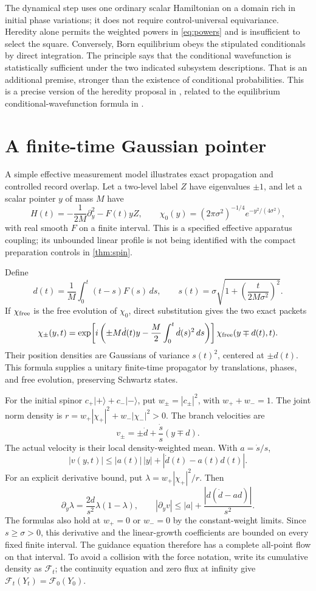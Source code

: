 \documentclass[11pt]{article}
\numberwithin{equation}{section}
\theoremstyle{definition}
\begin{document}
The dynamical step uses one ordinary scalar Hamiltonian on a domain rich in initial phase variations; it does not require control-universal equivariance. Heredity alone permits the weighted powers in \eqref{eq:powers} and is insufficient to select the square. Conversely, Born equilibrium obeys the stipulated conditionals by direct integration. The principle says that the conditional wavefunction is statistically sufficient under the two indicated subsystem descriptions. That is an additional premise, stronger than the existence of conditional probabilities. This is a precise version of the heredity proposal in \cite[Section 8]{GS2007}, related to the equilibrium conditional-wavefunction formula in \cite{DGZ1992}.

\section{A finite-time Gaussian pointer}\label{app:pointer}

A simple effective measurement model illustrates exact propagation and controlled record overlap. Let a two-level label \(Z\) have eigenvalues \(\pm1\), and let a scalar pointer \(y\) of mass \(M\) have
\[
 H(t)=-\frac{1}{2M}\partial_y^2-F(t)yZ,\qquad
 \chi_0(y)=(2\pi\sigma^2)^{-1/4}e^{-y^2/(4\sigma^2)},
\]
with real smooth \(F\) on a finite interval. This is a specified effective apparatus coupling; its unbounded linear profile is not being identified with the compact preparation controls in \cref{thm:spin}.

Define
\[
 d(t)=\frac1M\int_0^t(t-s)F(s)\,ds,\qquad
 s(t)=\sigma\sqrt{1+\left(\frac{t}{2M\sigma^2}\right)^2}.
\]
If \(\chi_{\rm free}\) is the free evolution of \(\chi_0\), direct substitution gives the two exact packets
\[
 \chi_\pm(y,t)=
 \exp\!\left[i\left(\pm M\dot d(t)y
            -\frac M2\int_0^t\dot d(s)^2\,ds\right)\right]
       \chi_{\rm free}(y\mp d(t),t).
\]
Their position densities are Gaussians of variance \(s(t)^2\), centered at \(\pm d(t)\). This formula supplies a unitary finite-time propagator by translations, phases, and free evolution, preserving Schwartz states.

For the initial spinor \(c_+|+\rangle+c_-|-\rangle\), put \(w_\pm=|c_\pm|^2\), with \(w_++w_-=1\). The joint norm density is
\(r=w_+|\chi_+|^2+w_-|\chi_-|^2>0\).
The branch velocities are
\[
 v_\pm=\pm\dot d+\frac{\dot s}{s}(y\mp d).
\]
The actual velocity is their local density-weighted mean. With \(a=\dot s/s\),
\[
 |v(y,t)|\le |a(t)|\,|y|+|\dot d(t)-a(t)d(t)|.
\]
For an explicit derivative bound, put \(\lambda=w_+|\chi_+|^2/r\). Then
\[
 \partial_y\lambda=\frac{2d}{s^2}\lambda(1-\lambda),\qquad
 |\partial_yv|\le |a|+\frac{|d(\dot d-ad)|}{s^2}.
\]
The formulas also hold at \(w_+=0\) or \(w_-=0\) by the constant-weight limits. Since \(s\ge\sigma>0\), this derivative and the linear-growth coefficients are bounded on every fixed finite interval. The guidance equation therefore has a complete all-point flow on that interval. To avoid a collision with the force notation, write its cumulative density as \(\mathcal F_t\); the continuity equation and zero flux at infinity give \(\mathcal F_t(Y_t)=\mathcal F_0(Y_0)\).
\end{document}
